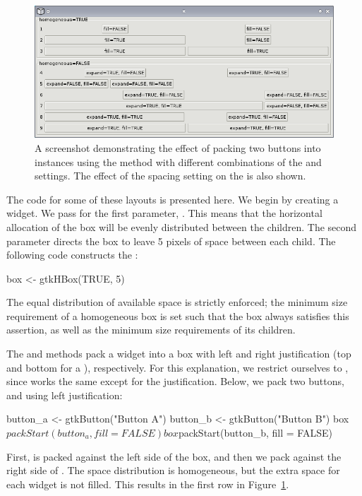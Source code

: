 \documentclass[article,shortnames]{jss}
\begin{document}
\begin{figure}[h!tbp]
\begin{center}
\includegraphics{packing.png}
\caption{\label{fig:packing}A screenshot demonstrating the effect of
packing two
buttons into  instances using the 
method 
with different combinations of the  and 
settings. 
The effect of the  spacing setting on the
 is 
also shown.}
\end{center}
\end{figure}

The code for some of these layouts is presented here. We begin by
creating a  widget. We pass  for the
first parameter, . This means that the horizontal
allocation of the box will be evenly distributed between the children. 
The second parameter directs the box to leave 5 pixels of space
between each child.  The following code constructs the :
\begin{Code}
box <- gtkHBox(TRUE, 5)
\end{Code}
The equal distribution of available space is strictly enforced; the
minimum size requirement of a homogeneous box is set such that the box
always satisfies this assertion, as well as the minimum size
requirements of its children.

The  and  methods pack a
widget into a box with left and right justification (top and
bottom for a ), respectively. For this explanation, we
restrict ourselves to , since
 works the same except for the
justification. Below, we pack two buttons,  and
 using left justification:
\begin{Code}
button_a <- gtkButton("Button A")
button_b <- gtkButton("Button B")
box$packStart(button_a, fill = FALSE)
box$packStart(button_b, fill = FALSE)
\end{Code}
First,  is packed against the left side of the box,
and then we pack  against the right side of
.
The space distribution is homogeneous, but
the extra space for each widget is not filled. This results in the
first row in Figure~\ref{fig:packing}.
\end{document}
